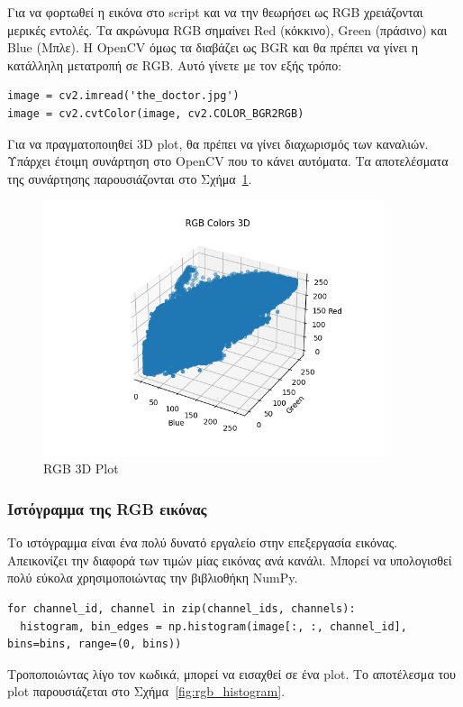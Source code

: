 Για να φορτωθεί η εικόνα στο script και να την θεωρήσει ως RGB χρειάζονται μερικές εντολές. Τα ακρώνυμα RGB σημαίνει Red (κόκκινο), Green (πράσινο) και Blue (Μπλε). Η OpenCV όμως τα διαβάζει ως BGR και θα πρέπει να γίνει η κατάλληλη μετατροπή σε RGB. Αυτό γίνετε με τον εξής τρόπο:

\begin{verbatim}
image = cv2.imread('the_doctor.jpg')
image = cv2.cvtColor(image, cv2.COLOR_BGR2RGB)
\end{verbatim}

Για να πραγματοποιηθεί 3D plot, θα πρέπει να γίνει διαχωρισμός των καναλιών. Υπάρχει έτοιμη συνάρτηση στο OpenCV που το κάνει αυτόματα. Τα αποτελέσματα της συνάρτησης παρουσιάζονται στο Σχήμα~\ref{fig:rgb_3d_plot}.

\begin{figure}[H]
  \centering
  \includegraphics[width=100mm]{Figures/rgb_3d}
  \caption{RGB 3D Plot}
  \label{fig:rgb_3d_plot}
\end{figure}

\subsubsection{Ιστόγραμμα της RGB εικόνας}

Το ιστόγραμμα είναι ένα πολύ δυνατό εργαλείο στην επεξεργασία εικόνας. Απεικονίζει την διαφορά των τιμών μίας εικόνας ανά κανάλι. Μπορεί να υπολογισθεί πολύ εύκολα χρησιμοποιώντας την βιβλιοθήκη NumPy.

\begin{verbatim}
for channel_id, channel in zip(channel_ids, channels):
  histogram, bin_edges = np.histogram(image[:, :, channel_id], bins=bins, range=(0, bins))
\end{verbatim}

Τροποποιώντας λίγο τον κωδικά, μπορεί να εισαχθεί σε ένα plot. Το αποτέλεσμα του plot παρουσιάζεται στο Σχήμα~\ref{fig:rgb_histogram}.

